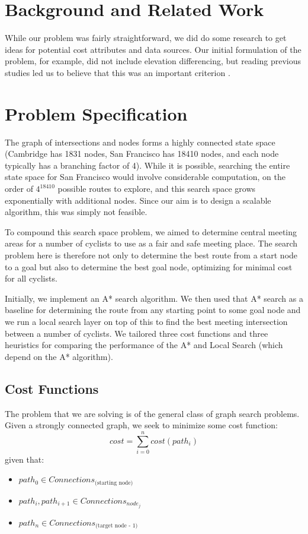 \documentclass[11pt]{article}
\begin{document}
\section{Background and Related Work}

While our problem was fairly straightforward, we did do some research to get ideas for potential cost attributes and data sources. Our initial formulation of the problem, for example, did not include elevation differencing, but reading previous studies led us to believe that this was an important criterion \cite{pmbr}.

\section{Problem Specification}
The graph of intersections and nodes forms a highly connected state space (Cambridge has 1831 nodes, San Francisco has 18410 nodes, and each node typically has a branching factor of 4). While it is possible, searching the entire state space for San Francisco would involve considerable computation, on the order of $4^{18410}$ possible routes to explore, and this search space grows exponentially with additional nodes. Since our aim is to design a scalable algorithm, this was simply not feasible.
\par To compound this search space problem, we aimed to determine central meeting areas for a number of cyclists to use as a fair and safe meeting place. The search problem here is therefore not only to determine the best route from a start node to a goal but also to determine the best goal node, optimizing for minimal cost for all cyclists.
\par Initially, we implement an A* search algorithm. We then used that A* search as a baseline for determining the route from any starting point to some goal node and we run a local search layer on top of this to find the best meeting intersection between a number of cyclists. We tailored three cost functions and three heuristics for comparing the performance of the A* and Local Search (which depend on the A* algorithm).

\subsection{Cost Functions}
The problem that we are solving is of the general class of graph search problems. Given a strongly connected graph, we seek to minimize some cost function:
\begin{equation}
cost = \sum_{i=0}^n cost(path_i)
\end{equation}
given that:
\begin{itemize}
\item $path_0 \in Connections_{\text{(starting node)}}$
\item $path_i, path_{i+1} \in Connections_{node_j}$
\item $path_n \in Connections_{\text{(target node - 1)}}$
\end{itemize}
\end{document}
